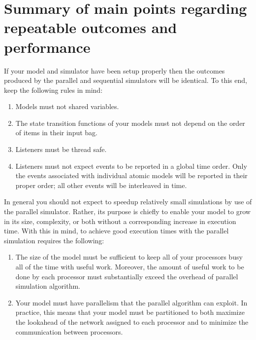 \section{Summary of main points regarding repeatable outcomes and performance}
If your model and simulator have been setup properly then the outcomes produced by the parallel and sequential simulators will be identical. To this end, keep the following rules in mind:
\begin{enumerate}
\item Models must not shared variables.
\item The state transition functions of your models must not depend on the order of items in their input bag.
\item Listeners must be thread safe.
\item Listeners must not expect events to be reported in a global time order. Only the events associated with individual atomic models will be reported in their proper order; all other events will be interleaved in time.
\end{enumerate}
In general you should not expect to speedup relatively small simulations by use of the parallel simulator. Rather, its purpose is chiefly to enable your model to grow in its size, complexity, or both without a corresponding increase in execution time. With this in mind, to achieve good execution times with the parallel simulation requires the following:
\begin{enumerate}
\item The size of the model must be sufficient to keep all of your processors busy all of the time with useful work. Moreover, the amount of useful work to be done by each processor must substantially exceed the overhead of parallel simulation algorithm.
\item Your model must have parallelism that the parallel algorithm can exploit. In practice, this means that your model must be partitioned to both maximize the lookahead of the network assigned to each processor and to minimize the communication between processors.
\end{enumerate}

